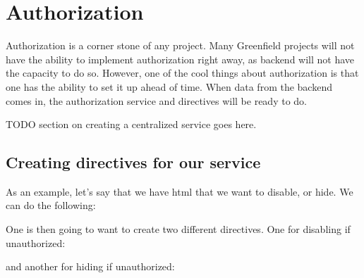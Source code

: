 \maketitle{}
\section{ Authorization }

Authorization is a corner stone of any project. Many Greenfield projects will
not have the ability to implement authorization right away, as backend will not
have the capacity to do so. However, one of the cool things about authorization
is that one has the ability to set it up ahead of time. When data from the
backend comes in, the authorization service and directives will be ready to do.

TODO section on creating a centralized service goes here.

\subsection{Creating directives for our service}
As an example, let's say that we have html that we want to disable, or hide. We
can do the following:


One is then going to want to create two different directives. One for disabling
if unauthorized:

and another for hiding if unauthorized:

